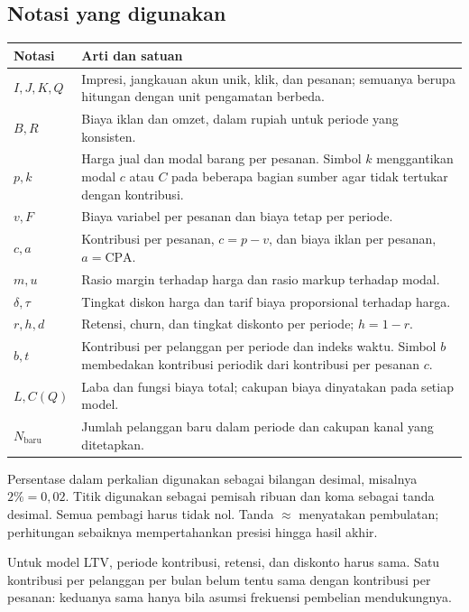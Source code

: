 \documentclass[11pt,a4paper]{article}
\newcommand{\bagian}[1]{\Needspace{5\baselineskip}\subsection{#1}}
\newcommand{\CPA}{\mathrm{CPA}}
\begin{document}
\bagian{Notasi yang digunakan}
\begin{longtable}{@{}>{\raggedright\arraybackslash}p{27mm}>{\raggedright\arraybackslash}p{123mm}@{}}
\toprule\textbf{Notasi}&\textbf{Arti dan satuan}\\\midrule\endhead
\(I,J,K,Q\)&Impresi, jangkauan akun unik, klik, dan pesanan; semuanya berupa hitungan dengan unit pengamatan berbeda.\\
\(B,R\)&Biaya iklan dan omzet, dalam rupiah untuk periode yang konsisten.\\
\(p,k\)&Harga jual dan modal barang per pesanan. Simbol \(k\) menggantikan modal \(c\) atau \(C\) pada beberapa bagian sumber agar tidak tertukar dengan kontribusi.\\
\(v,F\)&Biaya variabel per pesanan dan biaya tetap per periode.\\
\(c,a\)&Kontribusi per pesanan, \(c=p-v\), dan biaya iklan per pesanan, \(a=\CPA\).\\
\(m,u\)&Rasio margin terhadap harga dan rasio markup terhadap modal.\\
\(\delta,\tau\)&Tingkat diskon harga dan tarif biaya proporsional terhadap harga.\\
\(r,h,d\)&Retensi, churn, dan tingkat diskonto per periode; \(h=1-r\).\\
\(b,t\)&Kontribusi per pelanggan per periode dan indeks waktu. Simbol \(b\) membedakan kontribusi periodik dari kontribusi per pesanan \(c\).\\
\(L,C(Q)\)&Laba dan fungsi biaya total; cakupan biaya dinyatakan pada setiap model.\\
\(N_{\text{baru}}\)&Jumlah pelanggan baru dalam periode dan cakupan kanal yang ditetapkan.\\
\bottomrule
\end{longtable}
Persentase dalam perkalian digunakan sebagai bilangan desimal, misalnya \(2\%=0{,}02\). Titik digunakan sebagai pemisah ribuan dan koma sebagai tanda desimal. Semua pembagi harus tidak nol. Tanda \(\approx\) menyatakan pembulatan; perhitungan sebaiknya mempertahankan presisi hingga hasil akhir.

Untuk model LTV, periode kontribusi, retensi, dan diskonto harus sama. Satu kontribusi per pelanggan per bulan belum tentu sama dengan kontribusi per pesanan: keduanya sama hanya bila asumsi frekuensi pembelian mendukungnya.

\clearpage
\end{document}
